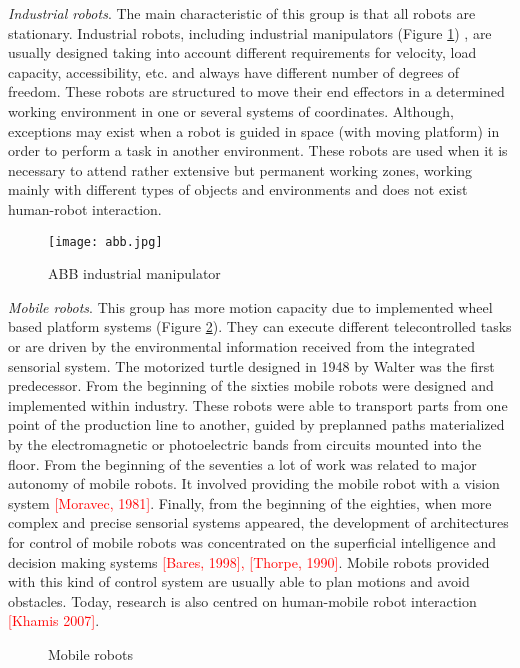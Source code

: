 \textit{Industrial robots}. The main characteristic of this group is that all robots are stationary. Industrial robots, including industrial manipulators (Figure \ref{fig:abb}) , are usually designed taking into account different requirements for velocity, load capacity, accessibility, etc. and always have different number of degrees of freedom. These robots are structured to move their end effectors in a determined working environment in one or several systems of coordinates. Although, exceptions may exist when a robot is guided in space (with moving platform) in order to perform a task in another environment. These robots are used when it is necessary to attend rather extensive but permanent working zones, working mainly with different types of objects and environments and does not exist human-robot interaction.
\begin{figure}[!hbt]
\centering
\texttt{[image: abb.jpg]}
\caption{ABB industrial manipulator}
\label{fig:abb}
\end{figure}
 
\textit{Mobile robots}. This group has more motion capacity due to implemented wheel based platform systems (Figure \ref{fig:mobile}). They can execute different telecontrolled tasks or are driven by the environmental information received from the integrated sensorial system. The motorized turtle designed in 1948 by Walter was the first predecessor. From the beginning of the sixties mobile robots were designed and implemented within industry. These robots were able to transport parts from one point of the production line to another, guided by preplanned paths materialized by the electromagnetic or photoelectric bands from circuits mounted into the floor. From the beginning of the seventies a lot of work was related to major autonomy of mobile robots. It involved providing the mobile robot with a vision system \textcolor{red}{[Moravec, 1981]}. Finally, from the beginning of the eighties, when more complex and precise sensorial systems appeared, the development of architectures for control of mobile robots was concentrated on the superficial intelligence and decision making systems \textcolor{red}{[Bares, 1998], [Thorpe, 1990]}. Mobile robots provided with this kind of control system are usually able to plan motions and avoid obstacles. Today, research is also centred on human-mobile robot interaction \textcolor{red}{[Khamis 2007]}. 

\begin{figure}[!hbt]
\centering
{}\hspace{10mm}
\caption{Mobile robots}
\label{fig:mobile}
\end{figure}

